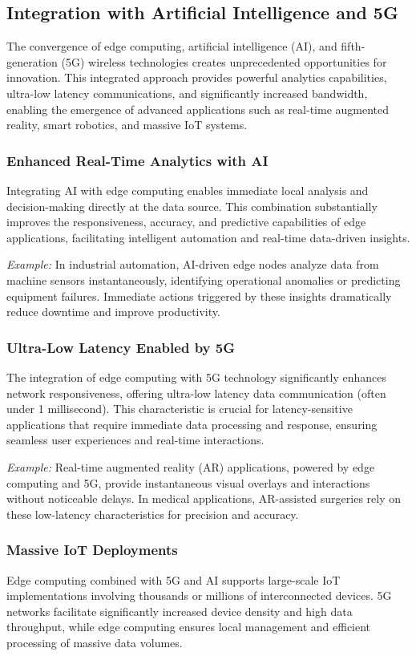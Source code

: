 \documentclass[runningheads]{llncs}
\begin{document}
\subsection{Integration with Artificial Intelligence and 5G}

The convergence of edge computing, artificial intelligence (AI), and fifth-generation (5G) wireless technologies creates unprecedented opportunities for innovation. This integrated approach provides powerful analytics capabilities, ultra-low latency communications, and significantly increased bandwidth, enabling the emergence of advanced applications such as real-time augmented reality, smart robotics, and massive IoT systems.

\subsubsection{Enhanced Real-Time Analytics with AI}
Integrating AI with edge computing enables immediate local analysis and decision-making directly at the data source. This combination substantially improves the responsiveness, accuracy, and predictive capabilities of edge applications, facilitating intelligent automation and real-time data-driven insights.

\textit{Example:} In industrial automation, AI-driven edge nodes analyze data from machine sensors instantaneously, identifying operational anomalies or predicting equipment failures. Immediate actions triggered by these insights dramatically reduce downtime and improve productivity.

\subsubsection{Ultra-Low Latency Enabled by 5G}
The integration of edge computing with 5G technology significantly enhances network responsiveness, offering ultra-low latency data communication (often under 1 millisecond). This characteristic is crucial for latency-sensitive applications that require immediate data processing and response, ensuring seamless user experiences and real-time interactions.

\textit{Example:} Real-time augmented reality (AR) applications, powered by edge computing and 5G, provide instantaneous visual overlays and interactions without noticeable delays. In medical applications, AR-assisted surgeries rely on these low-latency characteristics for precision and accuracy.

\subsubsection{Massive IoT Deployments}
Edge computing combined with 5G and AI supports large-scale IoT implementations involving thousands or millions of interconnected devices. 5G networks facilitate significantly increased device density and high data throughput, while edge computing ensures local management and efficient processing of massive data volumes.
\end{document}
